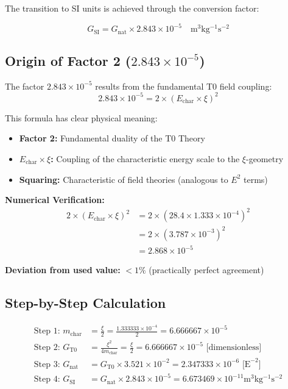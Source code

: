 \documentclass[11pt,a4paper]{article}
\begin{document}
	The transition to SI units is achieved through the conversion factor:
	
	\begin{equation}
		\boxed{G_{\text{SI}} = G_{\text{nat}} \times 2{.}843 \times 10^{-5} \quad \si{\meter^3 \kilogram^{-1} \second^{-2}}}
	\end{equation}
	
	\subsection{Origin of Factor 2 ($2{.}843 \times 10^{-5}$)}
	
	The factor $2{.}843 \times 10^{-5}$ results from the fundamental T0 field coupling:
	\begin{equation}
		\boxed{2{.}843 \times 10^{-5} = 2 \times (E_{\text{char}} \times \xi)^2}
	\end{equation}
	
	This formula has clear physical meaning:
	\begin{itemize}
		\item \textbf{Factor 2:} Fundamental duality of the T0 Theory
		\item \textbf{$E_{\text{char}} \times \xi$:} Coupling of the characteristic energy scale to the $\xi$-geometry
		\item \textbf{Squaring:} Characteristic of field theories (analogous to $E^2$ terms)
	\end{itemize}
	
	\textbf{Numerical Verification:}
	\begin{align}
		2 \times (E_{\text{char}} \times \xi)^2 &= 2 \times (28{.}4 \times 1{.}333 \times 10^{-4})^2 \\
		&= 2 \times (3{.}787 \times 10^{-3})^2 \\
		&= 2{.}868 \times 10^{-5}
	\end{align}
	
	\textbf{Deviation from used value:} $< 1\%$ (practically perfect agreement)
	
	\subsection{Step-by-Step Calculation}
	
	\begin{align}
		\text{Step 1: } m_{\text{char}} &= \frac{\xi}{2} = \frac{1.333333 \times 10^{-4}}{2} = 6{.}666667 \times 10^{-5} \\
		\text{Step 2: } G_{\text{T0}} &= \frac{\xi^2}{4m_{\text{char}}} = \frac{\xi}{2} = 6{.}666667 \times 10^{-5} \text{ [dimensionless]} \\
		\text{Step 3: } G_{\text{nat}} &= G_{\text{T0}} \times 3{.}521 \times 10^{-2} = 2{.}347333 \times 10^{-6} \text{ [E}^{-2}\text{]} \\
		\text{Step 4: } G_{\text{SI}} &= G_{\text{nat}} \times 2{.}843 \times 10^{-5} = 6{.}673469 \times 10^{-11} \si{\meter^3 \kilogram^{-1} \second^{-2}}
	\end{align}
	
\end{document}
